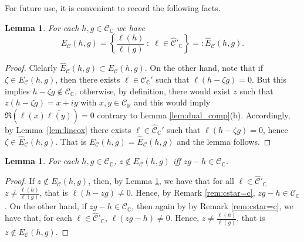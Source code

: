 \documentclass{amsart}
\numberwithin{equation}{section}
\newtheorem{lem}[thm]{Lemma}
\newcommand\cC{{\mathcal C}}
\newcommand\bC{{\mathbb C}}
\newcommand\bR{{\mathbb R}}
\begin{document}
For future use, it is convenient to record the following facts.
\begin{lem}\label{lem:are_the_same}
For each $h,g\in\cC_{\bC}$ we have
\[
E_\cC(h,g)=\left\{\frac{\ell(h)}{\ell(g)}\;:\; \ell\in\hat \cC'_{\bC}\right\}=:\widehat E_\cC(h,g).
\]
\end{lem}
\begin{proof}
Clelarly $\widehat E_\cC(h,g)\subset  E_\cC(h,g)$.
On the other hand, note that if $\zeta\in E_\cC(h,g)$, then there exists $\ell\in\cC_{\bC}'$ such that $\ell(h-\zeta g)=0$. But this implies $h-\zeta g\not\in\cC_{\bC}$, otherwise, by definition, there would exist $z$ such that $z(h-\zeta g)=x+iy$ with $x,y\in\cC_{\bR}$ and this would imply $\Re(\ell(x)\overline{\ell(y)})=0$ contrary to Lemma \ref{lem:dual_comp}(b). Accordingly, by Lemma~\ref{lem:lincox} there exists
 $\ell\in\hat\cC_{\bC}'$ such that $\ell(h-\zeta g)=0$, hence $\zeta\in \widehat E_\cC(h,g)$. That is $E_\cC(h,g)= \widehat E_\cC(h,g)$ and the lemma follows.
\end{proof}

\begin{lem}\label{lem:E-to-cone}
For each $h,g\in\cC_{\bC}$, $z\not \in E_{\cC}(h,g)$ iff $zg-h\in\cC_\bC$.
\end{lem}
\begin{proof}
If $z\not \in E_{\cC}(h,g)$, then, by Lemma \ref{lem:are_the_same}, we have that for all $\ell\in \hat \cC'_{\bC}$ $z\neq \frac {\ell(h)}{\ell(g)}$, that is $\ell(h-z g)\neq 0$. Hence, by Remark \ref{rem:cstar=c}, $zg-h\in\cC_\bC$. On the other hand, if $zg-h\in\cC_\bC$, then again by  by Remark \ref{rem:cstar=c}, we have that, for each $\ell\in \hat \cC'_{\bC}$, $\ell(zg-h)\neq 0$. Hence, $z\neq \frac {\ell(h)}{\ell(g)}$, that is $z\not \in E_{\cC}(h,g)$.
\end{proof}
\end{document}
